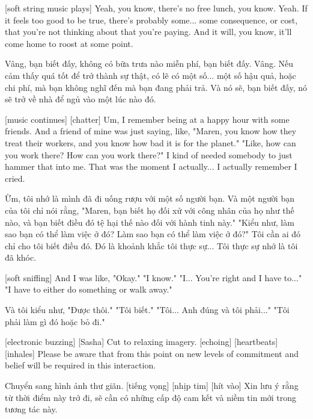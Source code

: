 \documentclass[a4paper]{article}
\begin{document}
	[soft string music plays]
	Yeah, you know, there's no free lunch, you know. Yeah.
	If it feels too good to be true, there's probably some... some consequence, or cost, that you're not thinking about that you're paying. And it will, you know, it'll come home to roost at some point.
	
	\begin{vietnamese-v2}
		Vâng, bạn biết đấy, không có bữa trưa nào miễn phí, bạn biết đấy. Vâng.
		Nếu cảm thấy quá tốt để trở thành sự thật, có lẽ có một số... một số hậu quả, hoặc chi phí, mà bạn không nghĩ đến mà bạn đang phải trả. Và nó sẽ, bạn biết đấy, nó sẽ trở về nhà để ngủ vào một lúc nào đó.
	\end{vietnamese-v2}
	
	[music continues]
	[chatter]
	Um, I remember being at a happy hour with some friends.
	And a friend of mine was just saying, like, "Maren, you know how they treat their workers, and you know how bad it is for the planet."
	"Like, how can you work there? How can you work there?"
	I kind of needed somebody to just hammer that into me.
	That was the moment I actually... I actually remember I cried.
	
	\begin{vietnamese-v2}
		Ừm, tôi nhớ là mình đã đi uống rượu với một số người bạn.
		Và một người bạn của tôi chỉ nói rằng, "Maren, bạn biết họ đối xử với công nhân của họ như thế nào, và bạn biết điều đó tệ hại thế nào đối với hành tinh này."
		"Kiểu như, làm sao bạn có thể làm việc ở đó? Làm sao bạn có thể làm việc ở đó?"
		Tôi cần ai đó chỉ cho tôi biết điều đó.
		Đó là khoảnh khắc tôi thực sự... Tôi thực sự nhớ là tôi đã khóc.
	\end{vietnamese-v2}
	
	[soft sniffing]
	And I was like, "Okay."
	"I know."
	"I... You're right and I have to..."
	"I have to either do something or walk away."
	
	\begin{vietnamese-v2}
		Và tôi kiểu như, "Được thôi."
		"Tôi biết."
		"Tôi... Anh đúng và tôi phải..."
		"Tôi phải làm gì đó hoặc bỏ đi."
	\end{vietnamese-v2}
	
	[electronic buzzing]
	[Sasha] Cut to relaxing imagery. [echoing]
	[heartbeats]
	[inhales]
	Please be aware that from this point on new levels of commitment and belief will be required in this interaction.
	
	\begin{vietnamese-v2}
		 Chuyển sang hình ảnh thư giãn. [tiếng vọng]
		[nhịp tim]
		[hít vào]
		Xin lưu ý rằng từ thời điểm này trở đi, sẽ cần có những cấp độ cam kết và niềm tin mới trong tương tác này.
	\end{vietnamese-v2}
	
\end{document}

